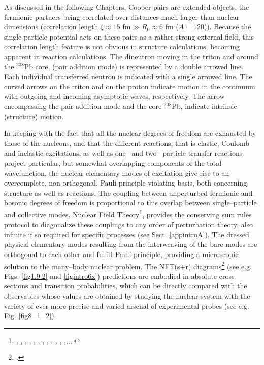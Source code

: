 As discussed in the following Chapters, Cooper pairs are extended objects, the fermionic partners being correlated over distances much larger than nuclear dimensions (correlation length $\xi\approx15$ fm$\gg R_0\approx 6$ fm ($A=120$)). Because the single particle potential acts on these pairs as a rather strong external field, this correlation length feature is not obvious in structure calculations, becoming apparent in reaction calculations. The dineutron  moving in the triton and around the $^{208}$Pb core, (pair addition mode) is represented by a double arrowed line. Each individual transferred neutron is indicated with a single arrowed line. The curved arrows on the triton and on the proton indicate motion in the continuum with outgoing and incoming asymptotic waves, respectively. The arrow encompassing the pair addition mode and the core $^{208}$Pb, indicate intrinsic (structure) motion. 


In keeping with the fact that all the nuclear degrees of freedom are exhausted by those of the nucleons, and that the different reactions, that is elastic, Coulomb and inelastic excitations, as well as  one-- and two-- particle transfer reactions project particular, but somewhat
 overlapping  components of the total wavefunction, the nuclear elementary modes of excitation give  rise to an overcomplete, non orthogonal, Pauli principle violating basis, both concerning structure as well as reactions. The coupling between unperturbed fermionic and bosonic degrees of freedom is proportional to this overlap between single--particle and collective modes. Nuclear Field Theory\footnote{\cite{Bes:74}, \cite{Bes:76a}, \cite{Bes:76b}, \cite{Bes:76c}, \cite{Bes:75}, \cite{Broglia:76}, \cite{Bes:75b}, \cite{Mottelson:76}, \cite{Bes:77}, \cite{Bortignon:77}, \cite{Bortignon:78}, \cite{Broglia:04a},\cite{Reinhardt:75},\cite{Reinhardt:78a},\cite{Reinhardt:78b},\cite{Reinhardt:80}.}, provides the conserving sum rules protocol to diagonalize these couplings  to any order of perturbation theory, also infinite if so required for specific processes (see Sect. \ref{appintroA}). The dressed physical elementary modes resulting from the interweaving of the bare modes are orthogonal to each other and fulfill Pauli principle, providing a microscopic solution to the many--body nuclear problem. 
 The NFT(s+r) diagrams\footnote{\cite{Broglia:75,Broglia:04a,Broglia:16}.} (see e.g. Figs. \ref{fig1.9.2} and  \ref{figintro6x}) predictions are embodied in absolute cross sections and transition probabilities, which can be directly compared with the observables whose values are obtained by studying the nuclear system with  the variety of ever more precise and varied arsenal of experimental probes (see e.g. Fig. \ref{fig8_1_2}). 

